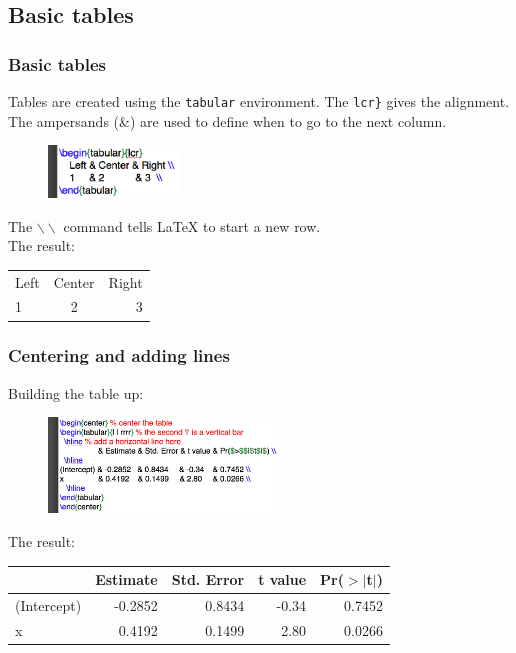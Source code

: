 \documentclass[slidestop,compress,mathserif]{beamer}
\begin{document}
\subsection[Basic tables]{Basic tables}
\begin{frame} \frametitle{Basic tables}
	Tables are created using the \texttt{\color{highlight}tabular} environment. The \text{\color{braces}\{}\texttt{lcr}\texttt{\color{braces}\}} gives the alignment. The ampersands ({\color{highlight}\&}) are used to define when to go to the next column.
	\begin{figure}[htbp]
		\centering
		\includegraphics[height=0.55in]{basicsOfLatex/tabTable/basicTable}
	\end{figure}
	The \texttt{\color{command}$\backslash\backslash$} command tells LaTeX to start a new row.  \\
	\vspace{0.3cm}
	The result: \\
	\vspace{0.3cm}
	\begin{tabular}{lcr} %
		Left & Center & Right \\ %
		1     & 2           & 3  \\
	\end{tabular}
\end{frame}

\begin{frame} \frametitle{Centering and adding lines}
	Building the table up:
	\begin{figure}[htbp]
		\centering
		\includegraphics[height=1.0in]{basicsOfLatex/tabTable/centeredTable}
	\end{figure}
	The result: \\
	\vspace{0.3cm}
	\begin{center} %
		\begin{tabular}{l | rrrr} %
			\hline %
			& Estimate & Std. Error & t value & Pr($>$$|$t$|$) \\
			\hline
			(Intercept) & -0.2852   & 0.8434     & -0.34    & 0.7452 \\
			x                & 0.4192    & 0.1499     & 2.80     & 0.0266 \\
			\hline
		\end{tabular}
	\end{center}
\end{frame}
\end{document}

